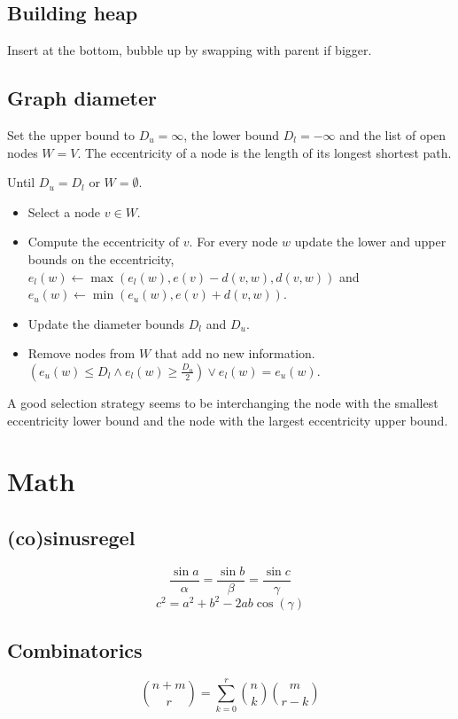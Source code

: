 \documentclass[10pt,hidelinks]{article}
\begin{document}
\subsection{Building heap}
Insert at the bottom, bubble up by swapping with parent if bigger.

\subsection{Graph diameter}
Set the upper bound to $D_u = \infty$, the lower bound $D_l = -\infty$ and the
list of open nodes $W = V$. The eccentricity of a node is the length of its
longest shortest path.

Until $D_u = D_l$ or $W = \emptyset$.
\begin{itemize}
	\item Select a node $v \in W$.
	\item Compute the eccentricity of $v$. For every node $w$ update the lower
		and upper bounds on the eccentricity, $e_l(w) \leftarrow \max(e_l(w),
		e(v) - d(v, w), d(v, w))$ and $e_u(w) \leftarrow \min(e_u(w), e(v)
		+ d(v, w))$.
	\item Update the diameter bounds $D_l$ and $D_u$.
	\item Remove nodes from $W$ that add no new information.
		$(e_u(w) \leq D_l \land e_l(w) \geq \frac{D_u}{2}) \lor e_l(w) =
		e_u(w)$.
\end{itemize}

A good selection strategy seems to be interchanging the node with the smallest
eccentricity lower bound and the node with the largest eccentricity upper bound.

\section{Math}


\subsection{(co)sinusregel}

\[\frac{\sin a}{\alpha} = \frac{\sin b}{\beta} =\frac{\sin c}{\gamma}\]
\[c^2=a^2+b^2-2ab\cos(\gamma)\]

\subsection{Combinatorics}

\[\binom{n+m}{r} = \sum_{k=0}^r \binom{n}{k} \binom{m}{r-k}\]
\end{document}
